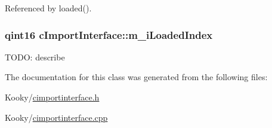 Referenced by loaded().

\subsubsection[{\texorpdfstring{m\+\_\+i\+Loaded\+Index}{m_iLoadedIndex}}]{\setlength{\rightskip}{0pt plus 5cm}qint16 c\+Import\+Interface\+::m\+\_\+i\+Loaded\+Index\hspace{0.3cm}{\ttfamily [protected]}}\hypertarget{classc_import_interface_ab18dd3e9cf49a07f23f376362fdf317b}{}\label{classc_import_interface_ab18dd3e9cf49a07f23f376362fdf317b}
T\+O\+DO\+: describe 

The documentation for this class was generated from the following files\+:\begin{DoxyCompactItemize}
\item 
Kooky/\hyperlink{cimportinterface_8h}{cimportinterface.\+h}\item 
Kooky/\hyperlink{cimportinterface_8cpp}{cimportinterface.\+cpp}\end{DoxyCompactItemize}
